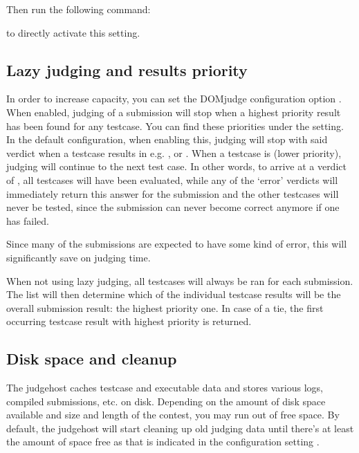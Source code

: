 \documentclass[a4paper,10pt,english,openany]{sphinxmanual}
\begin{document}
\sphinxAtStartPar
Then run the following command:

\begin{sphinxVerbatim}[commandchars=\\\{\}]
  
\end{sphinxVerbatim}

\sphinxAtStartPar
to directly activate this setting.


\subsection{Lazy judging and results priority}
\label{\detokenize{judging:lazy-judging-and-results-priority}}
\sphinxAtStartPar
In order to increase capacity, you can set the DOMjudge configuration option
. When enabled, judging of a submission will stop when
a highest priority result has been found for any testcase. You can find these
priorities under the  setting. In the default configuration,
when enabling this, judging will stop with said verdict when a testcase
results in e.g. ,  or . When a testcase
is  (lower priority), judging will continue to the next test case.
In other words, to arrive at a verdict of , all testcases will have
been evaluated, while any of the ‘error’ verdicts will immediately return this
answer for the submission and the other testcases will never be tested, since
the submission can never become correct anymore if one has failed.

\sphinxAtStartPar
Since many of the submissions are expected to have some kind of error, this
will significantly save on judging time.

\sphinxAtStartPar
When not using lazy judging, all testcases will always be ran for each
submission. The  list will then determine which of the
individual testcase results will be the overall submission result:
the highest priority one. In case of a tie, the first occurring testcase
result with highest priority is returned.


\subsection{Disk space and cleanup}
\label{\detokenize{judging:disk-space-and-cleanup}}
\sphinxAtStartPar
The judgehost caches testcase and executable data and stores various
logs, compiled submissions, etc. on disk. Depending on the amount of
disk space available and size and length of the contest, you may run
out of free space. By default, the judgehost will start cleaning up
old judging data until there’s at least the amount of space free as
that is indicated in the configuration setting .
\end{document}
